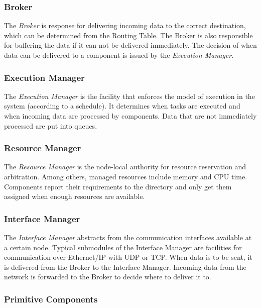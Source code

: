 \subsubsection{Broker}

The \emph{Broker} is response for delivering incoming data to the correct destination,
which can be determined from the Routing Table.
The Broker is also responsible for buffering the data if it can not be delivered immediately.
The decision of when data can be delivered to a component is issued by the \textit{Execution Manager}.

\subsubsection{Execution Manager}

The \emph{Execution Manager} is the facility that enforces the model of execution in the system
(according to a schedule).
It determines when tasks are executed and when incoming data are processed by components.
Data that are not immediately processed are put into queues.

\subsubsection{Resource Manager}

The \emph{Resource Manager} is the node-local authority for resource reservation and arbitration.
Among others, managed resources include memory and CPU time.
Components report their requirements to the directory and only get them assigned when enough resources are available.

\subsubsection{Interface Manager}

The \emph{Interface Manager} abstracts from the communication interfaces available at a certain node.
Typical submodules of the Interface Manager are facilities for communication over Ethernet/IP with UDP or TCP.
When data is to be sent, it is delivered from the Broker to the Interface Manager.
Incoming data from the network is forwarded to the Broker to decide where to deliver it to.

\subsubsection{Primitive Components}


